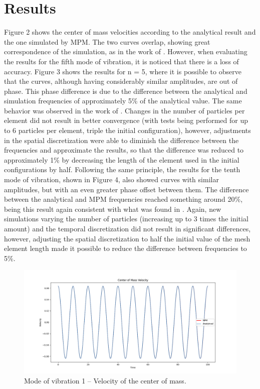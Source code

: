\documentclass[preprint,12pt]{elsarticle}
\begin{document}
\section{Results}
Figure 2 shows the center of mass velocities according to the analytical result and the one simulated by MPM. The two curves overlap, showing great correspondence of the simulation, as in the work of \cite{Bardenhagen2002}. However, when evaluating the results for the fifth mode of vibration, it is noticed that there is a loss of accuracy. Figure 3 shows the results for n = 5, where it is possible to observe that the curves, although having considerably similar amplitudes, are out of phase. This phase difference is due to the difference between the analytical and simulation frequencies of approximately 5\% of the analytical value. The same behavior was observed in the work of \cite{Bardenhagen2002}. Changes in the number of particles per element did not result in better convergence (with tests being performed for up to 6 particles per element, triple the initial configuration), however, adjustments in the spatial discretization were able to diminish the difference between the frequencies and approximate the results, so that the difference was reduced to approximately 1\% by decreasing the length of the element used in the initial configurations by half. Following the same principle, the results for the tenth mode of vibration, shown in Figure 4, also showed curves with similar amplitudes, but with an even greater phase offset between them. The difference between the analytical and MPM frequencies reached something around 20\%, being this result again consistent with what was found in \cite{Bardenhagen2002}. Again, new simulations varying the number of particles (increasing up to 3 times the initial amount) and the temporal discretization did not result in significant differences, however, adjusting the spatial discretization to half the initial value of the mesh element length made it possible to reduce the difference between frequencies to 5\%.

\begin{figure}
    	\includegraphics[width=\linewidth]{ModoVibracional1.png}
    	\caption{Mode of vibration 1 – Velocity of the center of mass.}
    	\centering
    \end{figure}
\end{document}
